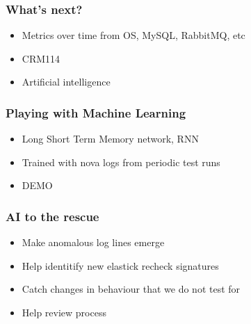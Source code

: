 \documentclass[aspectratio=169,11pt,hyperref={colorlinks=true}]{beamer}
\begin{document}

\begin{frame}
    \frametitle{What's next?}
    \begin{itemize}
        \item{Metrics over time from OS, MySQL, RabbitMQ, etc}
        \item{CRM114}
        \item{Artificial intelligence}
    \end{itemize}
\end{frame}


\begin{frame}
    \frametitle{Playing with Machine Learning}
    \begin{itemize}
        \item{Long Short Term Memory network, RNN}
        \item{Trained with nova logs from periodic test runs}
    \end{itemize}
    \begin{itemize}
        \item{DEMO}
    \end{itemize}
\end{frame}

\begin{frame}
    \frametitle{AI to the rescue}
    \begin{itemize}
        \item{Make anomalous log lines emerge}
    \end{itemize}
    \begin{itemize}
        \item{Help identitify new elastick recheck signatures}
        \item{Catch changes in behaviour that we do not test for}
        \item{Help review process}
    \end{itemize}
\end{frame}
\end{document}
